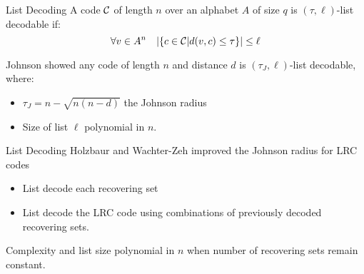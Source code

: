 \begin{frame}{List Decoding}
A code $\mathcal{C}$ of length $n$ over an alphabet $A$ of size $q$ is $(\tau, \ell)$-list decodable if:
$$\forall v \in A^n \quad \vert \{ c \in \mathcal{C} \vert d(v,c) \leq \tau \} \vert \leq \ell $$

Johnson showed any code of length $n$ and distance $d$ is $(\tau_J, \ell)$-list decodable, where:
\begin{itemize}
\item $\tau_J = n - \sqrt{n(n-d)}$ the Johnson radius
\item Size of list $\ell$ polynomial in $n$.
\end{itemize}
\end{frame}
\begin{frame}{List Decoding}
Holzbaur and Wachter-Zeh improved the Johnson radius for LRC codes
\begin{itemize}
\item List decode each recovering set 
\item List decode the LRC code using combinations of previously decoded recovering sets.
\end{itemize}

Complexity and list size polynomial in $n$ when number of recovering sets remain constant.

\end{frame}